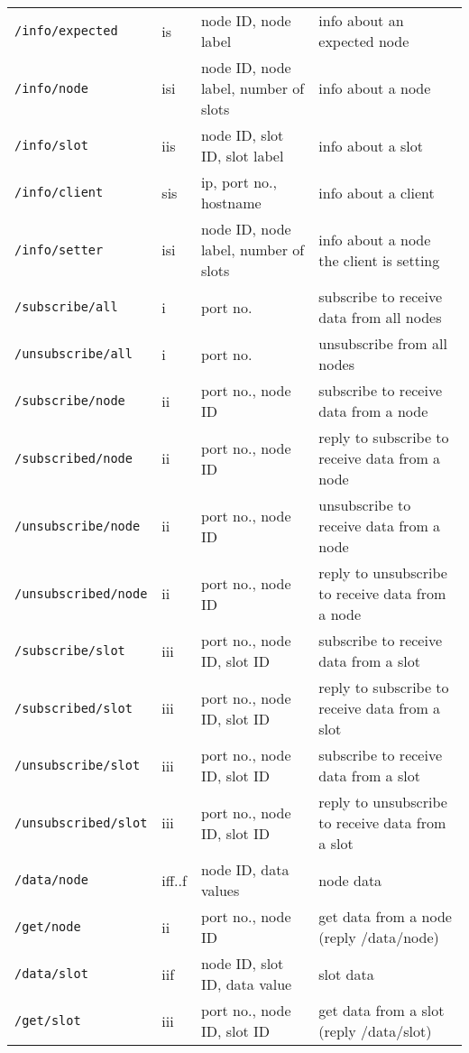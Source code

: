 \documentclass[letterpaper,10pt]{article}
\begin{document}
\begin{sidewaystable}[!tbp]
\begin{center}
\begin{tabular}{|llll|}
\verb|/info/expected| & is & node ID, node label & info about an expected node \\
\verb|/info/node| & isi & node ID, node label, number of slots & info about a node \\
\verb|/info/slot| & iis & node ID, slot ID, slot label & info about a slot \\
\verb|/info/client| & sis & ip, port no., hostname & info about a client \\
\verb|/info/setter| & isi & node ID, node label, number of slots & info about a node the client is setting \\

\verb|/subscribe/all| & i & port no. & subscribe to receive data from all nodes \\
\verb|/unsubscribe/all| & i & port no. & unsubscribe from all nodes \\

\verb|/subscribe/node| & ii & port no., node ID & subscribe to receive data from a node \\
\verb|/subscribed/node| & ii & port no., node ID & reply to subscribe to receive data from a node \\

\verb|/unsubscribe/node| & ii & port no., node ID & unsubscribe to receive data from a node \\
\verb|/unsubscribed/node| & ii & port no., node ID & reply to unsubscribe to receive data from a node \\

\verb|/subscribe/slot| & iii & port no., node ID, slot ID & subscribe to receive data from a slot \\  
\verb|/subscribed/slot| & iii & port no., node ID, slot ID & reply to subscribe to receive data from a slot \\  

\verb|/unsubscribe/slot| & iii & port no., node ID, slot ID & subscribe to receive data from a slot \\  
\verb|/unsubscribed/slot| & iii & port no., node ID, slot ID & reply to unsubscribe to receive data from a slot \\  

\verb|/data/node| & iff..f & node ID, data values & node data \\
\verb|/get/node| & ii & port no., node ID & get data from a node (reply /data/node) \\

\verb|/data/slot| & iif & node ID, slot ID, data value & slot data \\
\verb|/get/slot| & iii & port no., node ID, slot ID & get data from a slot (reply /data/slot) \\


\end{tabular}
\end{center}
\end{sidewaystable}
\end{document}
